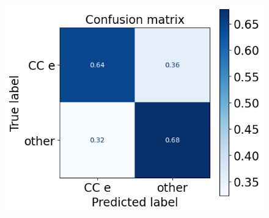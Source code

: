 \documentclass{pracalicmgr}
\begin{document}
\begin{figure}[H]
    \centering

    \begin{minipage}[t]{0.8\textwidth}
        \centering
        \includegraphics[width=\textwidth]{src/tranformerMatrixFinal.png}
        
    \end{minipage}

    \vspace{1cm}


\end{figure}
\end{document}
